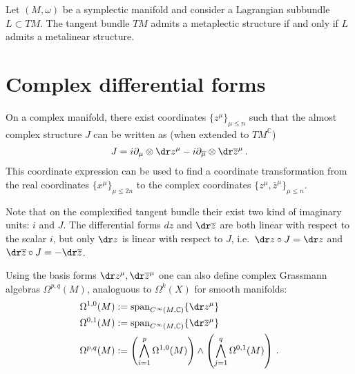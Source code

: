     \begin{property}\label{complex:metaplectic}
        Let $(M,\omega)$ be a symplectic manifold and consider a Lagrangian subbundle $L\subset TM$. The tangent bundle $TM$ admits a metaplectic structure if and only if $L$ admits a metalinear structure.
    \end{property}

\section{Complex differential forms}

    \begin{property}
        On a complex manifold, there exist coordinates $\{z^\mu\}_{\mu\leq n}$ such that the almost complex structure $J$ can be written as (when extended to $TM^{\mathbb{C}}$)
        \begin{gather}
            \label{complex:complex_structure}
            J = i\partial_\mu\otimes\dr z^\mu - i\partial_{\overline\mu}\otimes\dr\overline{z}^\mu\,.
        \end{gather}
        This coordinate expression can be used to find a coordinate transformation from the real coordinates $\{x^\mu\}_{\mu\leq2n}$ to the complex coordinates $\{z^\mu,\overline{z}^\mu\}_{\mu\leq n}$.
    \end{property}
    \begin{remark}
        Note that on the complexified tangent bundle their exist two kind of imaginary units: $i$ and $J$. The differential forms $dz$ and $\dr\overline{z}$ are both linear with respect to the scalar $i$, but only $\dr z$ is linear with respect to $J$, i.e.~$\dr z\circ J=\dr z$ and $\dr\overline{z}\circ J=-\dr\overline{z}$.
    \end{remark}

    Using the basis forms $\dr z^\mu,\dr\overline{z}^\mu$ one can also define complex Grassmann algebras $\Omega^{p,q}(M)$, analoguous to $\Omega^k(X)$ for smooth manifolds:
    \begin{align}
        \Omega^{1,0}(M) &:= \mathrm{span}_{C^\infty(M,\mathbb{C})}\{\dr z^\mu\}\\
        \Omega^{0,1}(M) &:= \mathrm{span}_{C^\infty(M,\mathbb{C})}\{\dr\overline{z}^\mu\}\\
        \Omega^{p,q}(M) &:= \left(\bigwedge_{i=1}^p\Omega^{1,0}(M)\right)\wedge\left(\bigwedge_{j=1}^q\Omega^{0,1}(M)\right)\,.
    \end{align}

